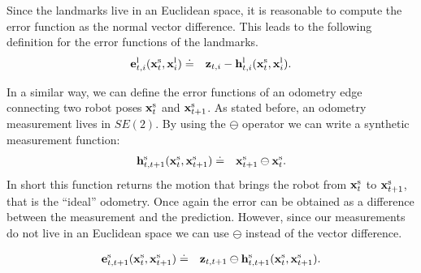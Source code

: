 \documentclass[a4paper]{article}
\begin{document}
Since the landmarks live in an Euclidean space, it is reasonable to
compute the error function as the normal vector difference.  This
leads to the following definition for the error functions of the
landmarks.
\begin{eqnarray}
    \mathbf{e}^\mathrm{l}_{t,i}(\mathbf{x}^\mathrm{s}_t, \mathbf{x}^\mathrm{l}_i)   & \doteq & \mathbf{z}_{t,i} - \mathbf{h}^\mathrm{l}_{t,i}(\mathbf{x}^\mathrm{s}_t, \mathbf{x}^\mathrm{l}_i).
    \label{eq:landmarkError}
\end{eqnarray}

In a similar way, we can define the error functions of an odometry
edge connecting two robot poses $\mathbf{x}^\mathrm{s}_t$ and
$\mathbf{x}^\mathrm{s}_{t+1}$. As stated before, an odometry measurement lives in $SE(2)$.
By using the $\ominus$ operator we can write a synthetic measurement function:
\begin{eqnarray}
    \mathbf{h}^\mathrm{s}_{t,t+1}(\mathbf{x}^\mathrm{s}_t, \mathbf{x}^\mathrm{s}_{t+1})   & \doteq & \mathbf{x}^\mathrm{s}_{t+1} \ominus \mathbf{x}^\mathrm{s}_{t}.
\end{eqnarray}
In short this function returns the motion that brings the robot from
$\mathbf{x}^\mathrm{s}_t$ to $\mathbf{x}^\mathrm{s}_{t+1}$, that is the ``ideal''
odometry.  Once again the error can be obtained as a difference
between the measurement and the prediction. However, since our measurements
do not live in an Euclidean space we can use $\ominus$ instead of the vector difference.

\begin{eqnarray}
    \mathbf{e}^\mathrm{s}_{t,t+1}(\mathbf{x}^\mathrm{s}_t, \mathbf{x}^\mathrm{s}_{t+1})   & \doteq & \mathbf{z}_{t,t+1} \ominus \mathbf{h}^\mathrm{s}_{t,t+1}(\mathbf{x}^\mathrm{s}_t, \mathbf{x}^\mathrm{s}_{t+1}).
    \label{eq:odometryError}
\end{eqnarray}
\end{document}
